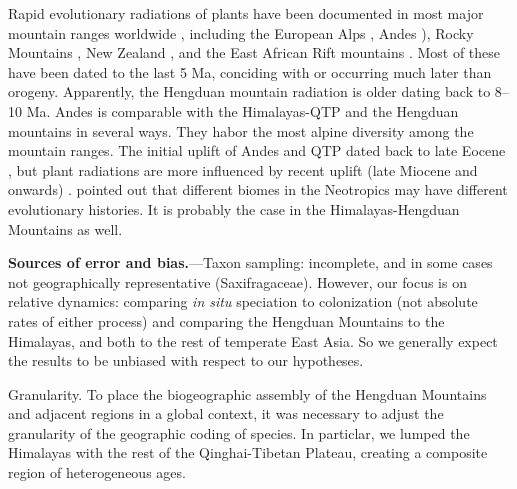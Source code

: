 Rapid evolutionary radiations of plants have been documented in most major mountain ranges worldwide \citep[reviewed in][]{Hughes2015}, including the European Alps \citep{Roquet2013}, Andes \citep[e.g.][]{Hughes2006,Luebert2014}), Rocky Mountains \citep{DrummondC2012}, New Zealand \citep{Joly2014}, and the East African Rift mountains \citep{Linder2014}. Most of these have been dated to the last 5 Ma, conciding with or occurring much later than orogeny. Apparently, the Hengduan mountain radiation is older dating back to 8--10 Ma. Andes is comparable with the Himalayas-QTP and the Hengduan mountains in several ways. They habor the most alpine diversity among the mountain ranges. The initial uplift of Andes and QTP dated back to late Eocene \citep{Gregory-Wodzicki2000,Graham2009}, but plant radiations are more influenced by recent uplift (late Miocene and onwards) \citep{Hughes2013,Luebert2014,Hughes2015,Madrinan2013}. \citet{Hughes2013} pointed out that different biomes in the Neotropics may have different evolutionary histories. It is probably the case in the Himalayas-Hengduan Mountains as well. 

\textbf{Sources of error and bias.}---Taxon sampling: incomplete, and in some cases not geographically representative (Saxifragaceae). However, our focus is on relative dynamics: comparing \textit{in situ} speciation to colonization (not absolute rates of either process) and comparing the Hengduan Mountains to the Himalayas, and both to the rest of temperate East Asia. So we generally expect the results to be unbiased with respect to our hypotheses.

Granularity. To place the biogeographic assembly of the Hengduan Mountains and adjacent regions in a global context, it was necessary to adjust the granularity of the geographic coding of species. In particlar, we lumped the Himalayas with the rest of the Qinghai-Tibetan Plateau, creating a composite region of heterogeneous ages.


